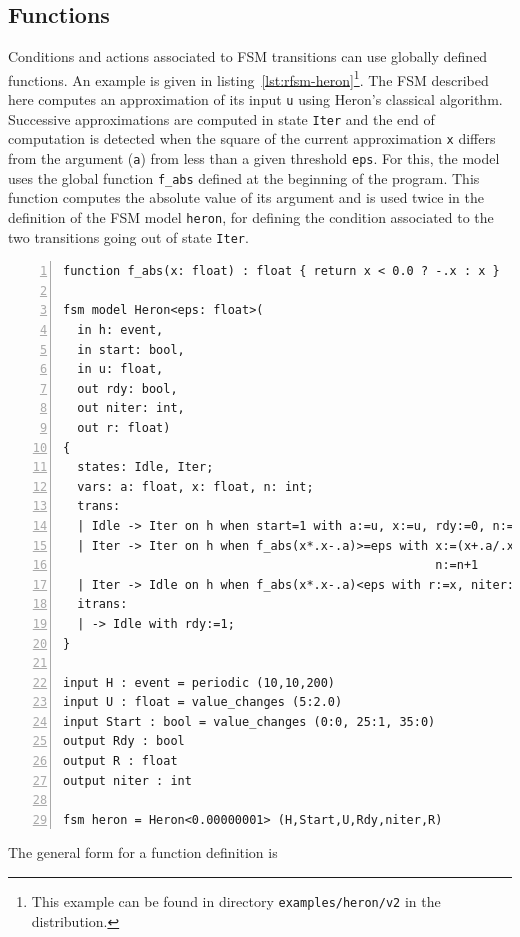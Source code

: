 \subsection{Functions}
\label{sec:functions}

Conditions and actions associated to FSM transitions can use globally defined functions. An example
is given in listing~\ref{lst:rfsm-heron}\footnote{This example can be found in directory
  \texttt{examples/heron/v2} in the distribution.}. The FSM described here computes an approximation
of its input \verb|u| using Heron's classical algorithm. Successive approximations are computed in
state \verb|Iter| and the end of computation is detected when the square of the current
approximation \verb|x| differs from the argument (\verb|a|) from less than a given threshold
\verb|eps|. For this, the model uses the global function \verb|f_abs| defined at the beginning of
the program. This function computes the absolute value of its argument and is used twice in the
definition of the FSM model \verb|heron|, for defining the condition associated to the two
transitions going out of state \verb|Iter|.

\begin{lstlisting}[language=Rfsm,frame=single,numbers=left,caption=An RFSM program using a global
  function definition,label={lst:rfsm-heron},float]
function f_abs(x: float) : float { return x < 0.0 ? -.x : x }

fsm model Heron<eps: float>(
  in h: event,
  in start: bool,
  in u: float,
  out rdy: bool,
  out niter: int,
  out r: float)
{
  states: Idle, Iter;
  vars: a: float, x: float, n: int;
  trans:
  | Idle -> Iter on h when start=1 with a:=u, x:=u, rdy:=0, n:=0
  | Iter -> Iter on h when f_abs(x*.x-.a)>=eps with x:=(x+.a/.x)/.2.,
                                                    n:=n+1
  | Iter -> Idle on h when f_abs(x*.x-.a)<eps with r:=x, niter:=n, rdy:=1;
  itrans:
  | -> Idle with rdy:=1;
}

input H : event = periodic (10,10,200)
input U : float = value_changes (5:2.0)
input Start : bool = value_changes (0:0, 25:1, 35:0)
output Rdy : bool
output R : float
output niter : int

fsm heron = Heron<0.00000001> (H,Start,U,Rdy,niter,R)
\end{lstlisting}

\medskip
\step The general form for a function definition is 

\begin{center}
\end{center}


